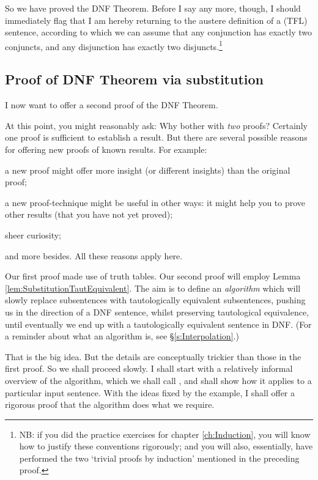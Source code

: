 So we have proved the DNF Theorem. Before I say any more, though, I should immediately flag that I am hereby returning to the austere definition of a (TFL) sentence, according to which we can assume that any conjunction has exactly two conjuncts, and any disjunction has exactly two disjuncts.\footnote{NB: if you did the practice exercises for chapter \ref{ch:Induction}, you will know how to justify these conventions rigorously; and you will also, essentially, have performed the two `trivial proofs by induction' mentioned in the preceding proof.}  


\subsection{Proof of DNF Theorem via substitution}\label{s:DNFsubstitution}
I now want to offer a second proof of the DNF Theorem. 

At this point, you might reasonably ask: Why bother with \emph{two} proofs? Certainly one proof is sufficient to establish a result. But there are several possible reasons for offering new proofs of known results. For example:
	\begin{ebullet}
		\item a new proof might offer more insight (or different insights) than the original proof;
		\item a new proof-technique might be useful in other ways: it might help you to prove other results (that you have not yet proved);
		\item sheer curiosity;
	\end{ebullet}
and more besides. All these reasons apply here. 

Our first proof made use of truth tables. Our second proof will employ Lemma \ref{lem:SubstitutionTautEquivalent}. The aim is to define an \emph{algorithm} which will slowly replace subsentences with tautologically equivalent subsentences, pushing us in the direction of a DNF sentence, whilst preserving tautological equivalence, until eventually we end up with a tautologically equivalent sentence in DNF. (For a reminder about what an algorithm is, see \S\ref{s:Interpolation}.) 

That is the big idea. But the details are conceptually trickier than those in the first proof. So we shall proceed slowly. I shall start with a relatively informal overview of the algorithm, which we shall call \intoDNF{}, and shall show how it applies to a particular input sentence. With the ideas fixed by the example, I shall offer a rigorous proof that the algorithm does what we require.

